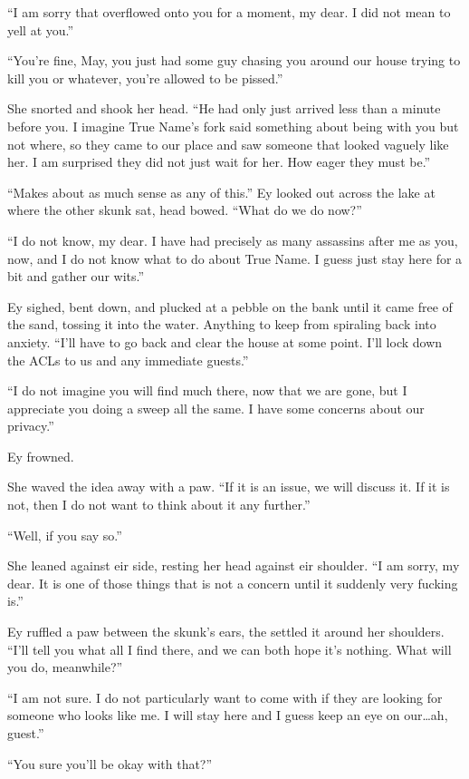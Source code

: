 ``I am sorry that overflowed onto you for a moment, my dear. I did not mean to yell at you.''

``You're fine, May, you just had some guy chasing you around our house trying to kill you or whatever, you're allowed to be pissed.''

She snorted and shook her head. ``He had only just arrived less than a minute before you. I imagine True Name's fork said something about being with you but not where, so they came to our place and saw someone that looked vaguely like her. I am surprised they did not just wait for her. How eager they must be.''

``Makes about as much sense as any of this.'' Ey looked out across the lake at where the other skunk sat, head bowed. ``What do we do now?''

``I do not know, my dear. I have had precisely as many assassins after me as you, now, and I do not know what to do about True Name. I guess just stay here for a bit and gather our wits.''

Ey sighed, bent down, and plucked at a pebble on the bank until it came free of the sand, tossing it into the water. Anything to keep from spiraling back into anxiety. ``I'll have to go back and clear the house at some point. I'll lock down the ACLs to us and any immediate guests.''

``I do not imagine you will find much there, now that we are gone, but I appreciate you doing a sweep all the same. I have some concerns about our privacy.''

Ey frowned.

She waved the idea away with a paw. ``If it is an issue, we will discuss it. If it is not, then I do not want to think about it any further.''

``Well, if you say so.''

She leaned against eir side, resting her head against eir shoulder. ``I am sorry, my dear. It is one of those things that is not a concern until it suddenly very fucking is.''

Ey ruffled a paw between the skunk's ears, the settled it around her shoulders. ``I'll tell you what all I find there, and we can both hope it's nothing. What will you do, meanwhile?''

``I am not sure. I do not particularly want to come with if they are looking for someone who looks like me. I will stay here and I guess keep an eye on our\ldots ah, guest.''

``You sure you'll be okay with that?''

